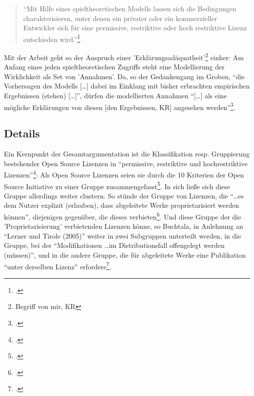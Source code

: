 \documentclass[DIV=calc,BCOR=5mm,11pt,headings=small,oneside,abstract=true, toc=bib]{scrartcl}
\begin{document}
\begin{quotation}\noindent\enquote{Mit Hilfe eines spieltheoretischen Modells lassen
sich die Bedingungen charakterisieren, unter denen ein privater oder ein kommerzieller
Entwickler sich für eine permissive, restriktive oder hoch restriktive Lizenz
entschieden wird.}\footcite[][26]{Buchtala2007a}
\end{quotation}

Mit der Arbeit geht so der Anspruch einer
'Erklärungsadäquatheit'\footnote{Begriff von mir, KR} einher: Am Anfang eines
jeden spieltheoretischen Zugriffs steht eine Modellierung der Wirklichkeit als Set von 'Annahmen'. Da, so der Gedankengang im Groben,
\enquote{die Vorhersagen des Modells [\ldots] dabei im Einklang mit bisher
erbrachten empirischen Ergebnissen (stehen) [\ldots]}, dürfen die
modellierten Annahmen \enquote{[\ldots] als eine mögliche Erklärungen von diesen
[den Ergebnissen, KR] angesehen werden}\footcite[][26]{Buchtala2007a}.

\subsection{Details}

Ein Kernpunkt der Gesamtargumentation ist die Klassifikation resp. Gruppierung
bestehender Open Source Lizenzen in \enquote{permissive, restriktive und
hochrestriktive Lizenzen}\footcite[cf.][55]{Buchtala2007a}: Als Open
Source Lizenzen seien sie durch die 10 Kriterien der Open Source Initiative zu
einer Gruppe zusammengefasst\footcite[cf.][53ff]{Buchtala2007a}. In sich
ließe sich diese Gruppe allerdings weiter clustern. So stünde der Gruppe von
Lizenzen, die \enquote{\ldots es dem Nutzer explizit (erlauben), dass abgeleitete
Werke proprietarisiert werden können}, diejenigen gegenüber, die dieses
verbieten\footcite[cf.][55]{Buchtala2007a}. Und diese Gruppe der die
'Proprietarisierung' verbietenden Lizenzen könne, so Buchtala, in Anlehnung an
\enquote{Lerner und Tirole (2005)} weiter in zwei Subgruppen unterteilt
werden, in die Gruppe, bei der \enquote{Modifikationen \ldots im Distributionsfall
offengelegt werden (müssen)}, und in die andere Gruppe, die für
abgeleitete Werke eine Publikation \enquote{unter derselben Lizenz}
erfordere\footcite[cf.][56]{Buchtala2007a}.
\end{document}

